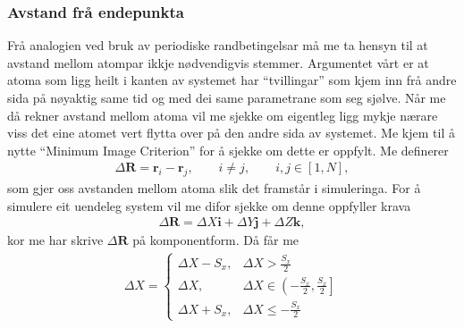 \documentclass[12pt, a4paper]{article}
\theoremstyle{definition} \newtheorem*{definition}{Teorem}
\newcommand{\vb}{\mathbf}
\begin{document}
        \subsubsection*{Avstand frå endepunkta}
            Frå analogien ved bruk av periodiske randbetingelsar må me ta hensyn til at avstand mellom atompar ikkje nødvendigvis stemmer. Argumentet vårt er at 
            atoma som ligg heilt i kanten av systemet har ``tvillingar'' som kjem inn frå andre sida på nøyaktig same tid og med dei same parametrane som seg sjølve.
            Når me då rekner avstand mellom atoma vil me sjekke om eigentleg ligg mykje nærare viss det eine atomet vert flytta over på den andre sida av systemet.
            Me kjem til å nytte ``Minimum Image Criterion'' for å sjekke om dette er oppfylt. Me definerer
            \begin{align*}
                \Delta \vb{R} = \vb{r}_i - \vb{r}_j, \qquad i \neq j, \qquad i, j \in [1, N],
            \end{align*}
            som gjer oss avstanden mellom atoma slik det framstår i simuleringa. For å simulere eit uendeleg system vil me difor sjekke om denne oppfyller krava
            \begin{align*}
                \Delta \vb{R} = \Delta X\vb{i} + \Delta Y\vb{j} + \Delta Z\vb{k},
            \end{align*}
            kor me har skrive $\Delta \vb{R}$ på komponentform. Då får me
            \begin{align*}
                \Delta X = 
                \begin{cases}
                    \Delta X - S_x, & \Delta X > \frac{S_x}{2} \\
                    \Delta X, & \Delta X \in \left( -\frac{S_x}{2}, \frac{S_x}{2} \right] \\
                    \Delta X + S_x, & \Delta X \leq -\frac{S_x}{2}
                \end{cases}
            \end{align*}
\end{document}
